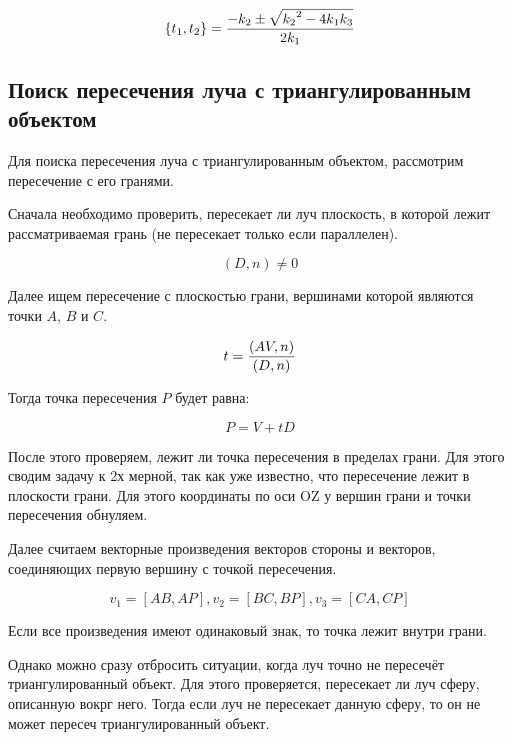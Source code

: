 \begin{equation}
\{ t_1, t_2 \} = {-k_2 \pm \sqrt{ {k_2}^2 -4k_1k_3} \over {2k_1}}
\end{equation}


\subsection{Поиск пересечения луча с триангулированным объектом}

Для поиска пересечения луча с триангулированным объектом, рассмотрим пересечение с его гранями.

Сначала необходимо проверить, пересекает ли луч плоскость, в которой лежит рассматриваемая грань (не пересекает только если параллелен).

\begin{equation}
(D, n) \neq 0
\end{equation}

Далее ищем пересечение с плоскостью грани, вершинами которой являются точки $A$, $B$ и $C$.

\begin{equation}
t = {(AV, n)\over(D, n)}
\end{equation}

Тогда точка пересечения $P$ будет равна:

\begin{equation}
P = V  + tD
\end{equation}

После этого проверяем, лежит ли точка пересечения в пределах грани. Для этого сводим задачу к 2х мерной, так как уже известно, что пересечение лежит в плоскости грани. Для этого координаты по оси OZ у вершин грани и точки пересечения обнуляем.

Далее считаем векторные произведения векторов стороны и векторов, соединяющих первую вершину с точкой пересечения.

\begin{equation}
v_1 = [AB, AP], v_2 = [BC, BP], v_3 = [CA, CP]
\end{equation}

Если все произведения имеют одинаковый знак, то точка лежит внутри грани.

Однако можно сразу отбросить ситуации, когда луч точно не пересечёт триангулированный объект. Для этого проверяется, пересекает ли луч сферу, описанную вокрг него. Тогда если луч не пересекает данную сферу, то он не может пересеч триангулированный объект.

